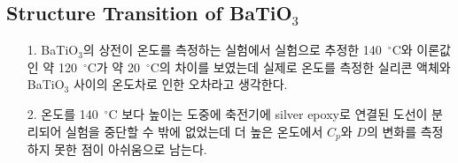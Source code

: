 \documentclass[aps,reprint,superscriptaddress,10pt]{revtex4-2}
\begin{document}
\subsection{Structure Transition of BaTiO$_3$}
\begin{itemize}
  \item[1. ] BaTiO$_3$의 상전이 온도를 측정하는 실험에서 실험으로 추정한 140~$^\circ$C와
  이론값인 약 120~$^\circ$C가 약 20~$^\circ$C의 차이를 보였는데 실제로 온도를 측정한 실리콘
  액체와 BaTiO$_3$ 사이의 온도차로 인한 오차라고 생각한다.
  \item[2. ] 온도를 140~$^\circ$C 보다 높이는 도중에 축전기에 silver epoxy로 연결된 도선이
  분리되어 실험을 중단할 수 밖에 없었는데 더 높은 온도에서 $C_p$와 $D$의 변화를 측정하지 못한
  점이 아쉬움으로 남는다.
\end{itemize}
\nocite{*}





\vfill
\end{document}

